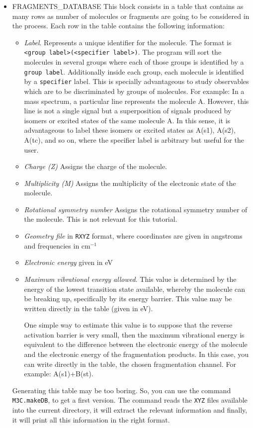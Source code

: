 \documentclass[a4paper,12pt]{article}
\begin{document}
\begin{itemize}
\item FRAGMENTS\_DATABASE
This block consists in 
a table that contains as many rows as number of molecules or fragments are going to be considered in the process.
Each row in the table contains the following information:
\begin{itemize}
\item \textit{Label}. Represents a unique identifier for the molecule. The format is \texttt{<group label>(<specifier 
label>)}. The program will sort the molecules in several groups where each of those groups is identified by a 
\texttt{group label}. Additionally inside each group, each molecule is identified by a \texttt{specifier} label. 
This is specially advantageous to study observables which are to be discriminated by groups of 
molecules. For example: In a mass spectrum, a particular line represents the molecule A.
However, this line is not a single signal but a superposition of signals produced by isomers or excited states of the same molecule A.
In this sense, it is advantageous to label these isomers or excited states as A(s1), A(s2), A(tc), and so on, where the specifier label
is arbitrary but useful for the user.

\item \textit{Charge (Z)} Assigns the charge of the molecule.
\item \textit{Multiplicity (M)} Assigns the multiplicity of the electronic state of the molecule.
\item \textit{Rotational symmetry number} Assigns the rotational symmetry number of the molecule. This is not relevant 
for this tutorial.
\item \textit{Geometry file} in \texttt{RXYZ} format, where coordinates are given in angstroms and frequencies 
in cm$^{-1}$
\item \textit{Electronic energy} given in eV
\item \textit{Maximum vibrational energy allowed}. This value is determined by the energy of the lowest 
transition state available, whereby the molecule can be breaking up, specifically by its energy barrier. This value may 
be written directly in the table (given in eV).

One simple way to estimate this value is to suppose that the reverse activation barrier is very small, then the maximum 
vibrational energy is equivalent to the difference between the electronic energy of the molecule and the electronic 
energy of the fragmentation products. In this case, you can write directly in the table, the chosen fragmentation 
channel. For example: A(s1)+B(st).
\end{itemize}

Generating this table may be too boring. So, you can use the command \texttt{M3C.makeDB}, to get a first version. The command reads the \texttt{XYZ} files 
available into the current directory, it will extract the relevant information and finally, it will print all this information in the right format.

\end{itemize}
\end{document}
